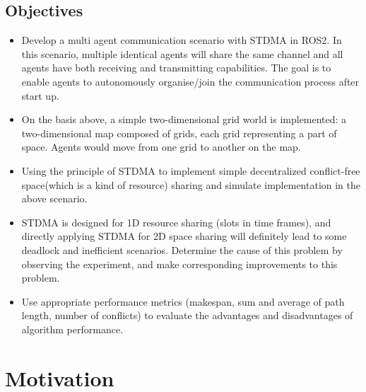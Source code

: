 \documentclass[12pt, oneside]{article}
\begin{document}
\subsection{Objectives}
\begin{itemize}
    \item Develop a multi agent communication scenario with STDMA in ROS2. In this scenario, multiple identical agents will share the same channel and all agents have both receiving and transmitting capabilities. The goal is to enable agents to autonomously organise/join the communication process after start up.
    \item On the basis above, a simple two-dimensional grid world is implemented: a two-dimensional map composed of grids, each grid representing a part of space. Agents would move from one grid to another on the map.
    \item Using the principle of STDMA \cite{STDMA} to implement simple decentralized conflict-free space(which is a kind of resource) sharing and simulate implementation in the above scenario.
    \item STDMA is designed for 1D resource sharing (slots in time frames), and directly applying STDMA for 2D space sharing will definitely lead to some deadlock and inefficient scenarios\cite{MAPF_Deadlock_Explain1}\cite{MAPF_Deadlock_Explain2}. Determine the cause of this problem by observing the experiment, and make corresponding improvements to this problem. 
    \item Use appropriate performance metrics (makespan, sum and average of path length, number of conflicts) to evaluate the advantages and disadvantages of algorithm performance. 
\end{itemize}

\section{Motivation}
\end{document}
